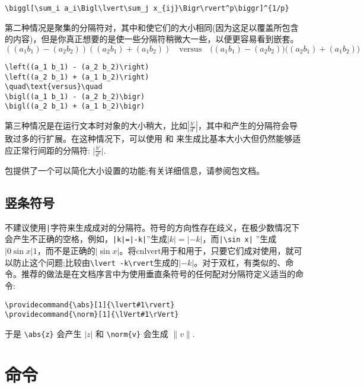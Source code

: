 \begin{verbatim}
\biggl[\sum_i a_i\Bigl\lvert\sum_j x_{ij}\Bigr\rvert^p\biggr]^{1/p}
\end{verbatim}
第二种情况是聚集的分隔符对，其中和使它们的大小相同(因为这足以覆盖所包含的内容)，但是你真正想要的是使一些分隔符稍微大一些，以便更容易看到嵌套。
\begin{equation*}
\left((a_1 b_1) - (a_2 b_2)\right)
\left((a_2 b_1) + (a_1 b_2)\right)
\quad\text{versus}\quad
\bigl((a_1 b_1) - (a_2 b_2)\bigr)
\bigl((a_2 b_1) + (a_1 b_2)\bigr)
\end{equation*}
\begin{verbatim}
\left((a_1 b_1) - (a_2 b_2)\right)
\left((a_2 b_1) + (a_1 b_2)\right)
\quad\text{versus}\quad
\bigl((a_1 b_1) - (a_2 b_2)\bigr)
\bigl((a_2 b_1) + (a_1 b_2)\bigr)
\end{verbatim}
第三种情况是在运行文本时对象的大小稍大，比如$\left\lvert\frac{b'}{d'}\right\rvert$，其中和产生的分隔符会导致过多的行扩展。在这种情况下，可以使用  和 来生成比基本大小大但仍然能够适应正常行间距的分隔符:
$\bigl\lvert\frac{b'}{d'}\bigr\rvert$.

包提供了一个可以简化大小设置的功能;有关详细信息，请参阅包文档。

\subsection{竖条符号}\label{verts}
不建议使用\verb'|'字符来生成成对的分隔符。符号的方向性存在歧义，在极少数情况下会产生不正确的空格，例如，\verb'|k|=|-k|'”生成$|k|=|-k|$，而\verb'|\sin x|' ”生成$ |0 \sin x |1 $，而不是正确的$\lvert\sin x\rvert$。将cn{lvert}用于和用于，只要它们成对使用，就可以防止这个问题;比较由\verb'\lvert -k\rvert'生成的$\lvert -k\rvert$。对于双杠，有类似的、命令。推荐的做法是在文档序言中为使用垂直条符号的任何配对分隔符定义适当的命令:
\begin{verbatim}
\providecommand{\abs}[1]{\lvert#1\rvert}
\providecommand{\norm}[1]{\lVert#1\rVert}
\end{verbatim}
于是 \verb|\abs{z}| 会产生 $\lvert z\rvert$ 和
\verb|\norm{v}| 会生成 $\lVert v\rVert$.


\section{ 命令}

